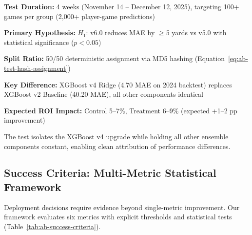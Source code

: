 \begin{table}[htbp]
\begin{tablenotes}
\item \textbf{Test Duration:} 4 weeks (November 14 -- December 12, 2025), targeting 100+ games per group (2,000+ player-game predictions)
\item \textbf{Primary Hypothesis:} $H_1$: v6.0 reduces MAE by $\geq$5 yards vs v5.0 with statistical significance ($p < 0.05$)
\item \textbf{Split Ratio:} 50/50 deterministic assignment via MD5 hashing (Equation~\ref{eq:ab-test-hash-assignment})
\item \textbf{Key Difference:} XGBoost v4 Ridge (4.70 MAE on 2024 backtest) replaces XGBoost v2 Baseline (40.20 MAE), all other components identical
\item \textbf{Expected ROI Impact:} Control 5--7\%, Treatment 6--9\% (expected +1--2 pp improvement)
\end{tablenotes}
\end{table}

The test isolates the XGBoost v4 upgrade while holding all other ensemble components constant, enabling clean attribution of performance differences.

\subsection{Success Criteria: Multi-Metric Statistical Framework}

Deployment decisions require evidence beyond single-metric improvement. Our framework evaluates six metrics with explicit thresholds and statistical tests (Table~\ref{tab:ab-success-criteria}).

